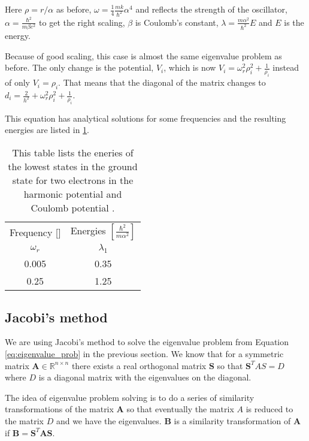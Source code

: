 Here $\rho = r/\alpha$ as before, $\omega = \frac{1}{4}\frac{mk}{\hbar^2}\alpha^4$ and reflects the strength of the oscillator, $\alpha = \frac{\hbar^2}{m \beta e^2}$ to get the right scaling, $\beta$ is Coulomb's constant, $\lambda = \frac{m\alpha^2}{\hbar^2}E$ and $E$ is the energy.

Because of good scaling, this case is almost the same eigenvalue problem as before. The only change is the potential, $V_i$, which is now $V_i = \omega_r^2 \rho_i^2+ \frac{1}{\rho_i}$ instead of only $V_i = \rho_i$. That means that the diagonal of the matrix changes to $d_i = \frac{2}{h^2} + \omega_r^2\rho_i^2 + \frac{1}{\rho_i}$.

This equation has analytical solutions for some frequencies and the resulting energies are listed in \ref{tab:analytical_energies}.

\begin{table}[H]\caption{This table lists the eneries of the lowest states in the ground state for two electrons in the harmonic potential and Coulomb potential \cite{taut1993two}.}\label{tab:analytical_energies}
\begin{tabular}{cc}
Frequency [] & Energies $\left[\frac{\hbar^2}{m \alpha^2}\right]$\\
$\omega_r$ & $\lambda_1$\\ \hline
0.005 & 0.35\\
0.25 & 1.25\\
\end{tabular}
\end{table}

\subsection{Jacobi's method}

We are using Jacobi's method to solve the eigenvalue problem from Equation \ref{eq:eigenvalue_prob} in the previous section. We know that for a symmetric matrix $\textbf{A} \in \mathbb{R}^{n\times n}$ there exists a real orthogonal matrix $\textbf{S}$ so that $ \textbf{S}^{T}AS = D$ where $D$ is a diagonal matrix with the eigenvalues on the diagonal.

The idea of eigenvalue problem solving is to do a series of similarity transformations of the matrix $\textbf{A}$ so that eventually the matrix $A$ is reduced to the matrix $D$ and we have the eigenvalues. $\textbf{B}$ is a similarity transformation of $\textbf{A}$ if $\textbf{B} = \textbf{S}^T\textbf{A}\textbf{S}$.

